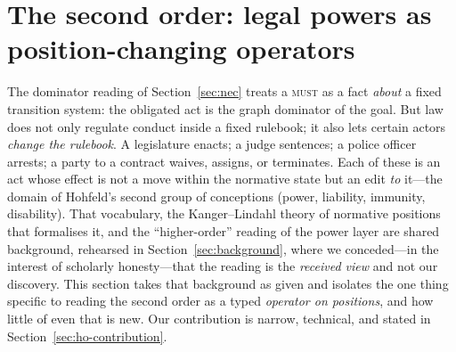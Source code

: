 %
%

\section{The second order: legal powers as position-changing operators}
\label{sec:hohfeld-higher-order}

The dominator reading of Section~\ref{sec:nec} treats a
\textsc{must} as a fact \emph{about} a fixed transition system: the obligated
act is the graph dominator of the goal. But law does not only regulate conduct
inside a fixed rulebook; it also lets certain actors \emph{change the rulebook}.
A legislature enacts; a judge sentences; a police officer arrests; a party to a
contract waives, assigns, or terminates. Each of these is an act whose effect is
not a move within the normative state but an edit \emph{to} it---the domain of
Hohfeld's second group of conceptions (power, liability, immunity, disability).
That vocabulary, the Kanger--Lindahl theory of normative positions that
formalises it, and the ``higher-order'' reading of the power layer are shared
background, rehearsed in Section~\ref{sec:background}, where we conceded---in the
interest of scholarly honesty---that the reading is the \emph{received view} and
not our discovery. This section takes that background as given and isolates the
one thing specific to reading the second order as a typed \emph{operator on
positions}, and how little of even that is new. Our contribution is narrow,
technical, and stated in Section~\ref{sec:ho-contribution}.

